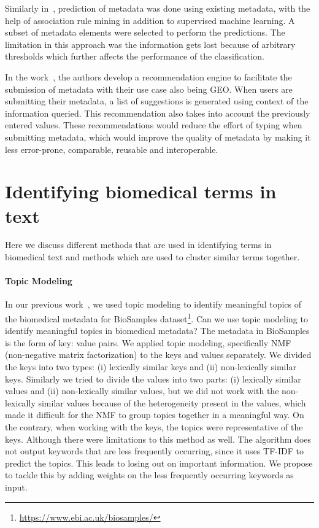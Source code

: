 Similarly in~\cite{panahiazar2017predicting}, prediction of metadata was done using existing metadata, with the help of association rule mining in addition to supervised machine learning. A subset of metadata elements were selected to perform the predictions. The limitation in this approach was the information gets lost because of arbitrary thresholds which further affects the performance of the classification. 

In the work~\cite{panahiazar2015context}, the authors develop a recommendation engine to facilitate the submission of metadata with their use case also being GEO. When users are submitting their metadata, a list of suggestions is generated using context of the information queried. This recommendation also takes into account the previously entered values. These recommendations would reduce the effort of typing when submitting metadata, which would improve the quality of metadata by making it less error-prone, comparable, reusable and interoperable. 

\section{Identifying biomedical terms in text}
Here we discuss different methods that are used in identifying terms in biomedical text and methods which are used to cluster similar terms together. 

\paragraph{Topic Modeling}
In our previous work~\cite{nayak2018quality}, we used topic modeling to identify meaningful topics of the biomedical metadata for BioSamples dataset\footnote{\url{https://www.ebi.ac.uk/biosamples/}}. Can we use topic modeling to identify meaningful topics in biomedical metadata? The metadata in BioSamples is the form of key: value pairs. We applied topic modeling, specifically NMF~\cite{lee1999learning} (non-negative matrix factorization) to the keys and values separately. We divided the keys into two types: (i) lexically similar keys and (ii) non-lexically similar keys. Similarly we tried to divide the values into two parts: (i) lexically similar values and (ii) non-lexically similar values, but we did not work with the non-lexically similar values because of the heterogeneity present in the values, which made it difficult for the NMF to group topics together in a meaningful way. On the contrary, when working with the keys, the topics were representative of the keys. Although there were limitations to this method as well. The algorithm does not output keywords that are less frequently occurring, since it uses TF-IDF to predict the topics. This leads to losing out on important information. We propose to tackle this by adding weights on the less frequently occurring keywords as input. 

